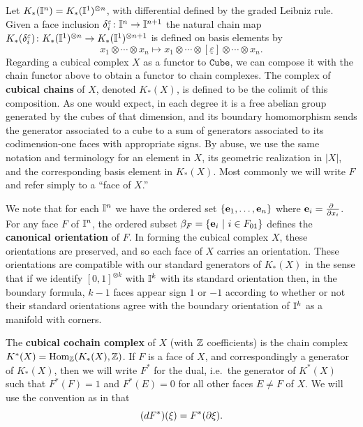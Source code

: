 Let $K_*(\mathbb{I}^n) = K_*(\mathbb{I}^1)^{\otimes n}$, with differential defined by the graded Leibniz rule.
Given a face inclusion $\delta_i^{\varepsilon} \colon \mathbb{I}^n \to \mathbb{I}^{n+1}$ the natural chain map $K_*(\delta_i^{\varepsilon}) \colon K_*(\mathbb{I}^1)^{\otimes n} \to K_*(\mathbb{I}^1)^{\otimes n+1}$ is defined on basis elements by
\begin{equation*}
x_1 \otimes \cdots \otimes x_n \mapsto
x_1 \otimes \cdots \otimes [\underline{\varepsilon}] \otimes \cdots \otimes x_n.
\end{equation*}
Regarding a cubical complex $X$ as a functor to $\mathtt{Cube}$, we can compose it with the chain functor above to obtain a functor to chain complexes.
The complex of \textbf{cubical chains} of $X$, denoted $K_*(X)$, is defined to be the colimit of this composition.
As one would expect, in each degree it is a free abelian group generated by the cubes of that dimension, and its boundary homomorphism sends the
generator associated to a cube to a sum of generators associated to its codimension-one faces with appropriate signs. By abuse, we use the same notation and terminology for an element in $X$, its geometric realization in $|X|$,
and the corresponding basis element in $K_*(X)$. Most commonly we will write $F$ and refer simply to a ``face of $X$.''

We note that for each $\mathbb{I}^n$ we have the ordered set $\{\mathbf{e}_1, \dots, \mathbf{e}_n\}$ where $\mathbf{e}_i = \frac{\partial\ }{\partial x_i}$.
For any face $F$ of $\mathbb{I}^n$, the ordered subset $\beta_F = \{\mathbf{e}_i\ |\ i \in F_{01}\}$ defines the \textbf{canonical orientation} of $F$. In forming the cubical complex $X$, these orientations are preserved, and so each face of $X$ carries an orientation. These orientations are compatible with our standard generators of $K_*(X)$ in the sense that if we identify $[0,1]^{\otimes k}$ with $\mathbb{I}^k$ with its standard orientation then, in the boundary formula, $k-1$ faces appear sign $1$ or $-1$ according to whether or not their standard orientations agree with the boundary orientation of $\mathbb{I}^k$ as a manifold with corners.




The \textbf{cubical cochain complex} of $X$ (with $\mathbb{Z}$ coefficients) is the chain complex $K^*(X) = \textup{Hom}_{\mathbb{Z}}(K_*(X), \mathbb{Z})$. If $F$ is a face of $X$, and correspondingly a generator of $K_*(X)$, then we will write $F^*$ for the dual, i.e.\ the generator of $K^*(X)$ such that $F^*(F) = 1$ and $F^*(E) = 0$ for all other faces $E\neq F$ of $X$. We will use the convention as in \cite{Mun84} that
$$(dF^*)(\xi) = F^*(\partial \xi).$$





